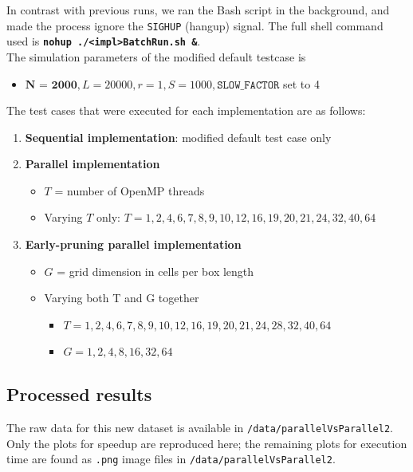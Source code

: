 \documentclass[12pt]{article}
\newcommand{\bt}[1]{\texttt{\textbf{#1}}}
\begin{document}
In contrast with previous runs, we ran the Bash script in the background, and made the process ignore the \texttt{SIGHUP} (hangup) signal. The full shell command used is \bt{nohup ./<impl>BatchRun.sh \&}. \\

The simulation parameters of the modified default testcase is
\begin{itemize}
	\item $\textbf{N = 2000}, L = 20000, r = 1, S = 1000, \texttt{SLOW\_FACTOR}$ set to 4
\end{itemize}

The test cases that were executed for each implementation are as follows:
\begin{enumerate}
	\item \textbf{Sequential implementation}: modified default test case only
	\item \textbf{Parallel implementation}
		\begin{itemize}
			\item $T$ = number of OpenMP threads
			\item Varying $T$ only: $T = 1, 2, 4, 6, 7, 8, 9, 10, 12, 16, 19, 20, 21, 24, 32, 40, 64$
		\end{itemize}
	\item \textbf{Early-pruning parallel implementation}
		\begin{itemize}
			\item $G$ = grid dimension in cells per box length
			\item Varying both T and G together
				\begin{itemize}
					\item $T = 1, 2, 4, 6, 7, 8, 9, 10, 12, 16, 19, 20, 21, 24, 28, 32, 40, 64$
					\item $G = 1, 2, 4, 8, 16, 32, 64$
				\end{itemize}
		\end{itemize}
\end{enumerate}

\subsection{Processed results}

The raw data for this new dataset is available in \texttt{/data/parallelVsParallel2}. Only the plots for speedup are reproduced here; the remaining plots for execution time are found as \texttt{.png} image files in \texttt{/data/parallelVsParallel2}. \\
\end{document}

